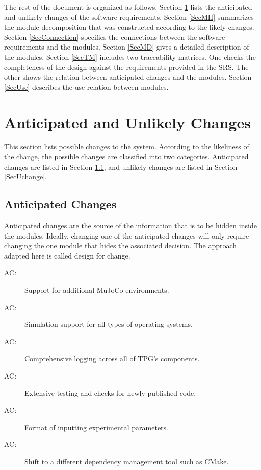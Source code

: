 \documentclass[12pt, titlepage]{article}
\newcounter{acnum}
\newcommand{\actheacnum}{AC\theacnum}
\begin{document}
The rest of the document is organized as follows. Section
\ref{SecChange} lists the anticipated and unlikely changes of the software
requirements. Section \ref{SecMH} summarizes the module decomposition that
was constructed according to the likely changes. Section \ref{SecConnection}
specifies the connections between the software requirements and the
modules. Section \ref{SecMD} gives a detailed description of the
modules. Section \ref{SecTM} includes two traceability matrices. One checks
the completeness of the design against the requirements provided in the SRS. The
other shows the relation between anticipated changes and the modules. Section
\ref{SecUse} describes the use relation between modules.

\section{Anticipated and Unlikely Changes} \label{SecChange}

This section lists possible changes to the system. According to the likeliness
of the change, the possible changes are classified into two
categories. Anticipated changes are listed in Section \ref{SecAchange}, and
unlikely changes are listed in Section \ref{SecUchange}.

\subsection{Anticipated Changes} \label{SecAchange}

Anticipated changes are the source of the information that is to be hidden
inside the modules. Ideally, changing one of the anticipated changes will only
require changing the one module that hides the associated decision. The approach
adapted here is called design for
change.

\begin{description}
  \item[ \actheacnum \label{acOutput1}:] Support for additional MuJoCo environments.
  \item[ \actheacnum \label{acOutput2}:] Simulation support for all types of operating systems.
  \item[ \actheacnum \label{acOutput3}:] Comprehensive logging across all of TPG's components.
  \item[ \actheacnum \label{acVerify1}:] Extensive testing and checks for newly published code.
  \item[ \actheacnum \label{acInput}:] Format of inputting experimental parameters.
  \item[ \actheacnum \label{acControl}:] Shift to a different dependency management tool such as CMake.
\end{description}
\end{document}
